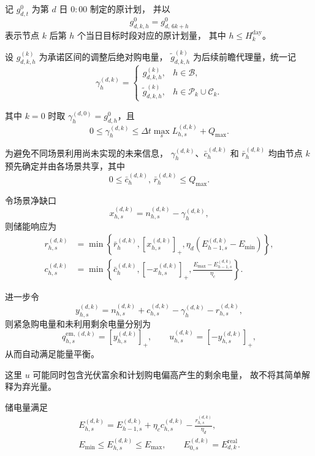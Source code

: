 \documentclass[zihao=-4,a4paper,UTF8,fontset=none]{ctexart}
\begin{document}
记 $g_{d,t}^{0}$ 为第 $d$ 日 $0{:}00$ 制定的原计划，
并以
\[
g_{d,k,h}^{0}
=
g_{d,\,6k+h}^{0}
\]
表示节点 $k$ 后第 $h$ 个当日目标时段对应的原计划量，
其中 $h\le H_k^{\mathrm{day}}$。

设 $g_{d,k,h}^{(k)}$ 为承诺区间的调整后绝对购电量，
$\widetilde g_{d,k,h}^{(k)}$ 为后续前瞻代理量，统一记
\begin{equation}
\gamma_h^{(d,k)}
=
\begin{cases}
g_{d,k,h}^{(k)},
& h\in\mathcal B,\\[1mm]
\widetilde g_{d,k,h}^{(k)},
& h\in\mathcal P_k\cup\mathcal C_k.
\end{cases}
\label{eq:q3_gamma}
\end{equation}

其中 $k=0$ 时取
$\gamma_h^{(d,0)}=g_{d,h}^{0}$，且
\[
0
\le
\gamma_h^{(d,k)}
\le
\Delta t\max_s L_{h,s}^{(d,k)}
+
Q_{\max}.
\]

为避免不同场景利用尚未实现的未来信息，
$\gamma_h^{(d,k)}$、$\bar c_h^{(d,k)}$ 和 $\bar r_h^{(d,k)}$
均由节点 $k$ 预先确定并由各场景共享，其中
\[
0
\le
\bar c_h^{(d,k)},\,
\bar r_h^{(d,k)}
\le
Q_{\max}.
\]

令场景净缺口
\[
x_{h,s}^{(d,k)}
=
n_{h,s}^{(d,k)}
-
\gamma_h^{(d,k)},
\]
则储能响应为
\begin{equation}
\begin{aligned}
r_{h,s}^{(d,k)}
&=
\min\left\{
\bar r_h^{(d,k)},
\left[x_{h,s}^{(d,k)}\right]_+,
\eta_d
\left(
E_{h-1,s}^{(d,k)}
-
E_{\min}
\right)
\right\},
\\
c_{h,s}^{(d,k)}
&=
\min\left\{
\bar c_h^{(d,k)},
\left[-x_{h,s}^{(d,k)}\right]_+,
\frac{
E_{\max}
-
E_{h-1,s}^{(d,k)}
}{
\eta_c
}
\right\}.
\end{aligned}
\label{eq:q3_storage_response}
\end{equation}

进一步令
\[
y_{h,s}^{(d,k)}
=
n_{h,s}^{(d,k)}
+
c_{h,s}^{(d,k)}
-
\gamma_h^{(d,k)}
-
r_{h,s}^{(d,k)},
\]
则紧急购电量和未利用剩余电量分别为
\[
q_{h,s}^{\mathrm{em},(d,k)}
=
\left[y_{h,s}^{(d,k)}\right]_+,
\qquad
u_{h,s}^{(d,k)}
=
\left[-y_{h,s}^{(d,k)}\right]_+,
\]
从而自动满足能量平衡。

这里 $u$ 可能同时包含光伏富余和计划购电偏高产生的剩余电量，
故不将其简单解释为弃光量。

储电量满足
\begin{equation}
\begin{gathered}
E_{h,s}^{(d,k)}
=
E_{h-1,s}^{(d,k)}
+
\eta_c c_{h,s}^{(d,k)}
-
\frac{
r_{h,s}^{(d,k)}
}{
\eta_d
},
\\
E_{\min}
\le
E_{h,s}^{(d,k)}
\le
E_{\max},
\qquad
E_{0,s}^{(d,k)}
=
E_{d,k}^{\mathrm{real}}.
\end{gathered}
\label{eq:q3_storage_state}
\end{equation}
\end{document}
